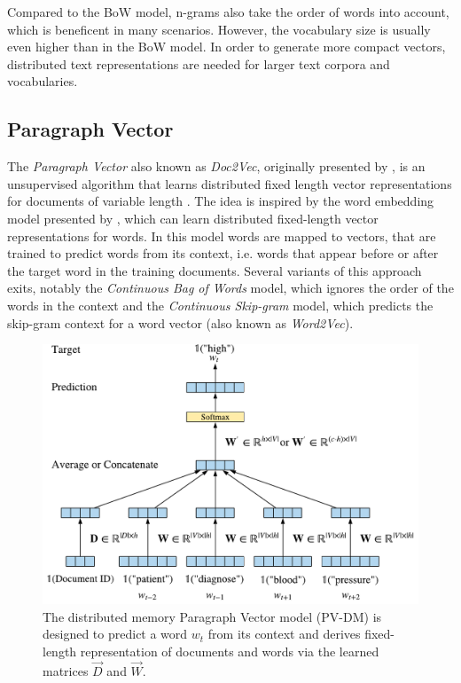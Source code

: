 Compared to the BoW model, n-grams also take the order of words into account, which is beneficent in many scenarios.
However, the vocabulary size is usually even higher than in the BoW model.
In order to generate more compact vectors, distributed text representations are needed for larger text corpora and vocabularies.


\subsection{Paragraph Vector}

The \textit{Paragraph Vector} also known as \textit{Doc2Vec}, originally presented by \citeauthor{DBLP:conf/icml/LeM14}, is an unsupervised algorithm that learns distributed fixed length vector representations for documents of variable length \cite{DBLP:conf/icml/LeM14}.
The idea is inspired by the word embedding model presented by \citeauthor{DBLP:journals/jmlr/BengioDVJ03} \cite{DBLP:journals/jmlr/BengioDVJ03}, which can learn distributed fixed-length vector representations for words.
In this model words are mapped to vectors, that are trained to predict words from its context, i.e. words that appear before or after the target word in the training documents.
Several variants of this approach exits, notably the \textit{Continuous Bag of Words} model, which ignores the order of the words in the context and the \textit{Continuous Skip-gram} model, which predicts the skip-gram context for a word vector (also known as \textit{Word2Vec})\cite{DBLP:journals/corr/abs-1301-3781}.

\begin{figure}[!htbp]
	\centering
	\includegraphics[width=\textwidth]{figures/paragraph-vector}
	\caption{The distributed memory Paragraph Vector model (PV-DM) is designed to predict a word $w_t$ from its context and derives fixed-length representation of documents and words via the learned matrices $\vec{D}$ and $\vec{W}$.}
	\label{fig:paragraph-vector}
\end{figure}


